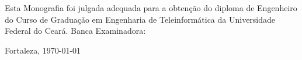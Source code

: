 \thispagestyle{empty}%

\begin{center}
    \textsc{ \autor } \\
     \vspace{.5 cm} \textbf{ \titulo }     \\
\end{center}
    \vspace{.2 cm}
    Esta Monografia foi julgada adequada para a obten\c{c}\~{a}o do diploma de Engenheiro do Curso de Gradua\c{c}\~{a}o em Engenharia de Teleinform\'{a}tica da Universidade Federal do Cear\'{a}.
    \assinatura{\autor}
    \vspace{0.2 cm}
     Banca Examinadora:
     \assinatura{\membroa\\}
     \assinatura{\membrob \\}
     \vspace{0.2 cm}%

\begin{center}
    {\normalsize    Fortaleza, \today}
\end{center}
